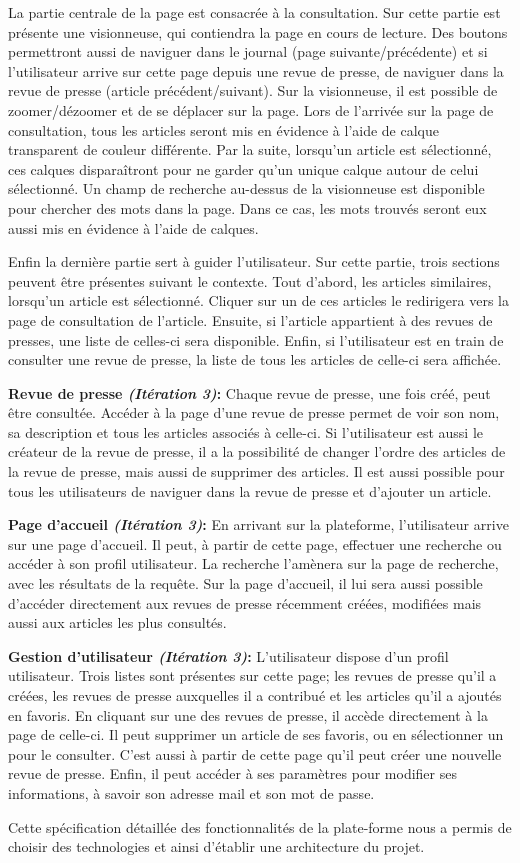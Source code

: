 	La partie centrale de la page est consacrée à la consultation. Sur cette partie est présente une visionneuse, qui contiendra la page en cours de lecture. Des boutons permettront aussi de naviguer dans le journal (page suivante/précédente) et si l'utilisateur arrive sur cette page depuis une revue de presse, de naviguer dans la revue de presse (article précédent/suivant). Sur la visionneuse, il est possible de zoomer/dézoomer et de se déplacer sur la page. Lors de l'arrivée sur la page de consultation, tous les articles seront mis en évidence à  l'aide de calque transparent de couleur différente. Par la suite, lorsqu'un article est sélectionné, ces calques disparaîtront pour ne garder qu'un unique calque autour de celui sélectionné. Un champ de recherche au-dessus de la visionneuse est disponible pour chercher des mots dans la page. Dans ce cas, les mots trouvés seront eux aussi mis en évidence à l'aide de calques. 
	
	Enfin la dernière partie sert à guider l'utilisateur. Sur cette partie, trois sections peuvent être présentes suivant le contexte. Tout d'abord, les articles similaires, lorsqu'un article est sélectionné. Cliquer sur un de ces articles le redirigera vers la page de consultation de l'article. Ensuite, si l'article appartient à des revues de presses, une liste de celles-ci sera disponible. Enfin, si l'utilisateur est en train de consulter une revue de presse, la liste de tous les articles de celle-ci sera affichée.


	\textbf{Revue de presse \textit{(Itération 3)}:} Chaque revue de presse, une fois créé, peut être consultée. Accéder à la page d'une revue de presse permet de voir son nom, sa description et tous les articles associés à celle-ci. Si l'utilisateur est aussi le créateur de la revue de presse, il a la possibilité de changer l'ordre des articles de la revue de presse, mais aussi de supprimer des articles. Il est aussi possible pour tous les utilisateurs de naviguer dans la revue de presse et d'ajouter un article.

	\textbf{Page d'accueil \textit{(Itération 3)}:} En arrivant sur la plateforme, l'utilisateur arrive sur une page d'accueil. Il peut, à partir de cette page, effectuer une recherche ou accéder à son profil utilisateur. La recherche l'amènera sur la page de recherche, avec les résultats de la requête. Sur la page d'accueil, il lui sera aussi possible d'accéder directement aux revues de presse récemment créées, modifiées mais aussi aux articles les plus consultés.

	\textbf{Gestion d'utilisateur \textit{(Itération 3)}:} L'utilisateur dispose d'un profil utilisateur. Trois listes sont présentes sur cette page; les revues de presse qu'il a créées, les revues de presse auxquelles il a contribué et les articles qu'il a ajoutés en favoris. En cliquant sur une des revues de presse, il accède directement à  la page de celle-ci. Il peut supprimer un article de ses favoris, ou en sélectionner un pour le consulter. C'est aussi à partir de cette page qu'il peut créer une nouvelle revue de presse. Enfin, il peut accéder à ses paramètres pour modifier ses informations, à savoir son adresse mail et son mot de passe.

Cette spécification détaillée des fonctionnalités de la plate-forme nous a permis de choisir des technologies et ainsi d'établir une architecture du projet.

